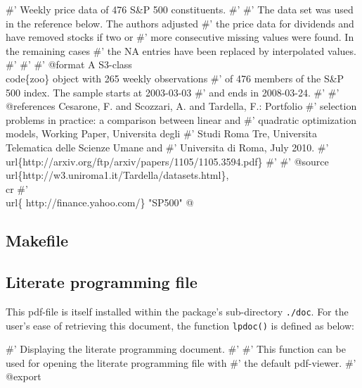 \documentclass[a4paper]{article}
\begin{document}
\nwenddocs{}\endmoddef\let\nwnotused=\nwoutput{}
#' Weekly price data of 476 S&P 500 constituents.
#'
#' The data set was used in the reference below. The authors adjusted
#' the price data for dividends and have removed stocks if two or
#' more consecutive missing values were found. In the remaining cases
#' the NA entries have been replaced by interpolated values.
#'
#'
#' @format A S3-class \\code\{zoo\} object with 265 weekly observations
#' of 476 members of the S&P 500 index. The sample starts at 2003-03-03
#' and ends in 2008-03-24.
#'
#' @references Cesarone, F. and Scozzari, A. and Tardella, F.: Portfolio
#'     selection problems in practice: a comparison between linear and
#'     quadratic optimization models, Working Paper, Universita degli
#'     Studi Roma Tre, Universita Telematica delle Scienze Umane and
#'     Universita di Roma, July 2010.
#'     \\url\{http://arxiv.org/ftp/arxiv/papers/1105/1105.3594.pdf\}
#'
#' @source \\url\{http://w3.uniroma1.it/Tardella/datasets.html\},\\cr
#' \\url\{ http://finance.yahoo.com/\}
"SP500"
\nwnotused{data.R}\nwendcode{}@

\subsection{Makefile}
\label{smake}

\subsection{Literate programming file}
This pdf-file is itself installed within the package's sub-directory
\verb?./doc?. For the user's ease of retrieving this document, the
function \verb?lpdoc()? is defined as below:

\nwenddocs{}\endmoddef\let\nwnotused=\nwoutput{}
#' Displaying the literate programming document.
#'
#' This function can be used for opening the literate programming file with
#' the default pdf-viewer.
#' @export
\end{document}
